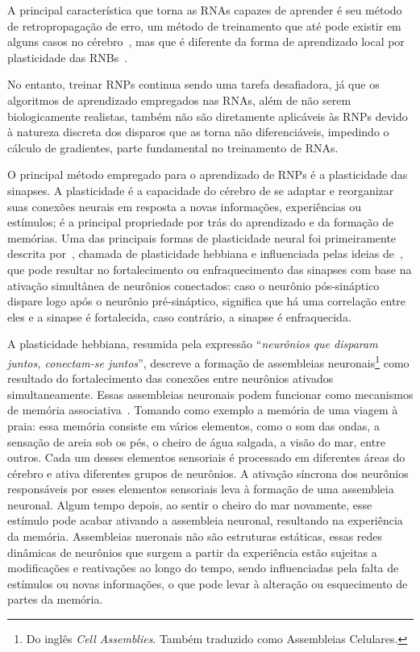 A principal característica que torna as RNAs capazes de aprender é seu método de retropropagação de erro, um método de treinamento
que até pode existir em alguns casos no cérebro~\cite{lillicrapBackpropagation2020,songCan2020}, mas que é diferente da forma de
aprendizado local por plasticidade das RNBs~\cite{yamazakiSpiking2022}.

No entanto, treinar RNPs continua sendo uma tarefa desafiadora, já que os algoritmos de aprendizado empregados nas RNAs, além de
não serem biologicamente realistas, também não são diretamente aplicáveis às RNPs devido à natureza discreta dos disparos que as
torna não diferenciáveis, impedindo o cálculo de gradientes, parte fundamental no treinamento de RNAs.

O principal método empregado para o aprendizado de RNPs é a plasticidade das sinapses. A plasticidade é a capacidade do cérebro de
se adaptar e reorganizar suas conexões neurais em resposta a novas informações, experiências ou estímulos; é a principal
propriedade por trás do aprendizado e da formação de memórias. Uma das principais formas de plasticidade neural foi primeiramente
descrita por~, chamada de plasticidade hebbiana e influenciada pelas ideias
de~, que pode resultar no fortalecimento ou enfraquecimento das sinapses com base na ativação
simultânea de neurônios conectados: caso o neurônio pós-sináptico dispare logo após o neurônio pré-sináptico, significa que há uma
correlação entre eles e a sinapse é fortalecida, caso contrário, a sinapse é enfraquecida.

A plasticidade hebbiana, resumida pela expressão ``\textit{neurônios que disparam juntos, co\-nectam-se juntos}'', descreve a
formação de assembleias neuronais\footnote{Do inglês \textit{Cell Assemblies}. Também traduzido como Assembleias Celulares.} como
resultado do fortalecimento das conexões entre neurônios ativados simultaneamente. Essas assembleias neuronais podem funcionar
como mecanismos de memória associativa~\cite{sakuraiMultiple2018}. Tomando como exemplo a memória de uma viagem à praia: essa
memória consiste em vários elementos, como o som das ondas, a sensação de areia sob os pés, o cheiro de água salgada, a visão do
mar, entre outros. Cada um desses elementos sensoriais é processado em diferentes áreas do cérebro e ativa diferentes grupos de
neurônios. A ativação síncrona dos neurônios responsáveis por esses elementos sensoriais leva à formação de uma assembleia
neuronal. Algum tempo depois, ao sentir o cheiro do mar novamente, esse estímulo pode acabar ativando a assembleia neuronal,
resultando na experiência da memória. Assembleias nueronais não são estruturas estáticas, essas redes dinâmicas de neurônios que
surgem a partir da experiência estão sujeitas a modificações e reativações ao longo do tempo, sendo influenciadas pela falta de
estímulos ou novas informações, o que pode levar à alteração ou esquecimento de partes da memória.


